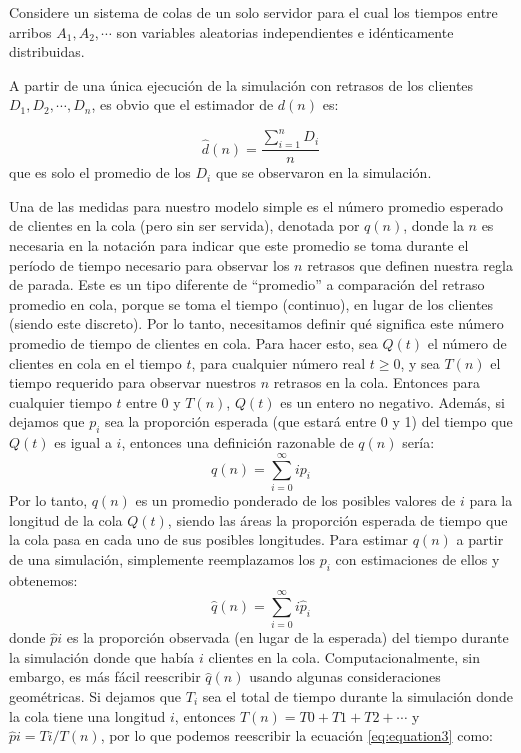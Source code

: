 Considere un sistema de colas de un solo servidor para el cual los tiempos entre arribos $A_{1}, A_{2}, \cdots$ son variables aleatorias independientes e idénticamente distribuidas.

A partir de una única ejecución de la simulación con retrasos de los clientes $D_{1}, D_{2}, \cdots, D_{n}$, es obvio que el
estimador de $d(n)$ es:

\begin{equation} \label{eq:equation}
\hat{d}(n) = \frac{\sum_{i = 1}^{n}D_{i}}{n}
\end{equation}
que es solo el promedio de los $D_{i}$ que se observaron en la simulación.

Una de las medidas para nuestro modelo simple es el número promedio esperado de clientes en la cola (pero sin
ser servida), denotada por $q(n)$, donde la $n$ es necesaria en la notación para indicar que este promedio se
toma durante el período de tiempo necesario para observar los $n$ retrasos que definen
nuestra regla de parada.
Este es un tipo diferente de ``promedio'' a comparación del retraso promedio en cola, porque se toma el tiempo
(continuo), en lugar de los clientes (siendo este discreto).
Por lo tanto, necesitamos definir qué significa este número promedio de tiempo de
clientes en cola.
Para hacer esto, sea $Q(t)$ el número de clientes en cola en el tiempo $t$, para cualquier número real $t \geq 0$,
y sea $T(n)$ el tiempo requerido para observar nuestros $n$ retrasos en la cola.
Entonces para cualquier tiempo $t$ entre $0$ y $T(n)$, $Q(t)$ es un entero no negativo. Además, si dejamos que $p_{i}$ sea la
proporción esperada (que estará entre 0 y 1) del tiempo que $Q(t)$ es igual a $i$, entonces una definición
razonable de $q(n)$ sería:
 \begin{equation}
   \label{eq:equation2}
q(n) = \sum_{i=0}^{\infty}ip_{i}
 \end{equation}
Por lo tanto, $q(n)$ es un promedio ponderado de los posibles valores de $i$ para la longitud de la cola $Q(t)$,
siendo las áreas la proporción esperada de tiempo que la cola pasa en cada uno de sus posibles longitudes.
Para estimar $q(n)$ a partir de una simulación, simplemente reemplazamos los $p_{i}$ con estimaciones de ellos y
obtenemos:
\begin{equation}
  \label{eq:equation3}
  \hat{q}(n) = \sum_{i=0}^{\infty}i\hat{p}_{i}
\end{equation}
donde $\hat{p}i$ es la proporción observada (en lugar de la esperada) del tiempo durante la simulación
donde que había $i$ clientes en la cola.
Computacionalmente, sin embargo, es más fácil reescribir $\hat{q}(n)$ usando algunas consideraciones geométricas.
Si dejamos que $T_{i}$ sea el total de tiempo durante la simulación donde la cola tiene una longitud $i$, entonces
$T(n) = T0 + T1 + T2 + \cdots$ y $\hat{p}i = Ti/T(n)$, por lo que podemos reescribir la ecuación \ref{eq:equation3} como:

